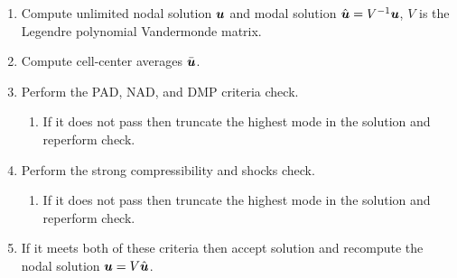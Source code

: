 \documentclass[11pt]{article}
\begin{document}
\begin{enumerate}
    \item Compute unlimited nodal solution $\boldsymbol{u}$ and modal solution $\hat{\boldsymbol{u}} = V^{-1} \boldsymbol{u}$, $V$ is the Legendre polynomial Vandermonde matrix.
    \item Compute cell-center averages $\bar{\boldsymbol{u}}$.
    \item Perform the PAD, NAD, and DMP criteria check.
    \begin{enumerate}
        \item If it does not pass then truncate the highest mode in the solution and reperform check. 
    \end{enumerate}
    \item Perform the strong compressibility and shocks check.
    \begin{enumerate}
        \item If it does not pass then truncate the highest mode in the solution and reperform check. 
    \end{enumerate}
    \item If it meets both of these criteria then accept solution and recompute the nodal solution $\boldsymbol{u} = V\hat{\boldsymbol{u}}$.
\end{enumerate}




\end{document}

